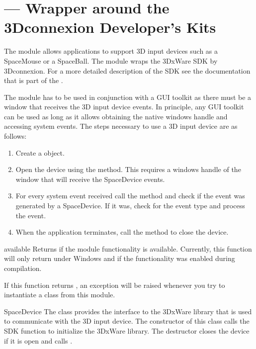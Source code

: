 \section{ ---
          Wrapper around the 3Dconnexion Developer's Kits}


The  module allows applications to support
3D input devices such as a SpaceMouse or a SpaceBall. The module
wraps the 3DxWare SDK by 3Dconnexion. For a more detailed description
of the SDK see the documentation that is part of the
.

The module has to be used in conjunction with a GUI toolkit as there must
be a window that receives the 3D input device events. In principle, any
GUI toolkit can be used as long as it allows obtaining the native windows
handle and accessing system events. The steps necessary to use a 3D input
device are as follows:

\begin{enumerate}
\item Create a  object.
\item Open the device using the  method. This requires a windows
handle of the window that will receive the SpaceDevice events.
\item For every system event received call the 
method and check if the event was generated by a SpaceDevice.
If it was, check for the event type and process the event.
\item When the application terminates, call the  method to
close the device.

\end{enumerate}

\begin{funcdesc}{available}{}
Returns  if the module functionality is available. Currently,
this function will only return  under Windows and if the
functionality was enabled during compilation.

If this function returns , an exception will be raised
whenever you try to instantiate a class from this module.
\end{funcdesc}


\begin{classdesc}{SpaceDevice}{}
The  class provides the interface to the 3DxWare
library that is used to communicate with the 3D input device. The
constructor of this class calls the SDK function  
to initialize the 3DxWare library. The destructor closes the device if
it is open and calls .
\end{classdesc}

